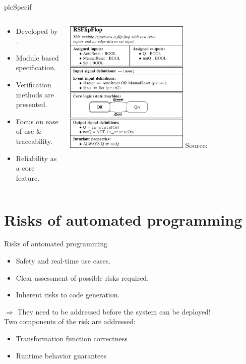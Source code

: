 \documentclass[18pt]{beamer}
\begin{document}
\begin{frame}{plcSpecif}
 	\begin{columns}
 		\begin{column}{0.5\textwidth}
 			\begin{itemize}
 				\item Developed by \cite{7819191}.
 				\item Module based specification.
 				\item Verification methods are presented.
 				\item Focus on ease of use \& traceability.
 				\item Reliability as a core feature.
 			\end{itemize}
 		\end{column}
	 	\begin{column}{0.5\textwidth}
	 		\centering
	 		\includegraphics[width=0.6\textwidth]{./figures/plcspecif.png}
	 		{\footnotesize  Source:~\cite{darvas2015formal}}
	 	\end{column}
 	\end{columns}
\end{frame}

\section{Risks of automated programming}

\begin{frame}{Risks of automated programming}
\begin{itemize}
    \item Safety and real-time use cases.
    \item Clear assessment of possible risks required.
    \item Inherent risks to code generation.
\end{itemize}
$\Rightarrow$ They need to be addressed before the system can be deployed!
\pause
\\
Two components of the risk are addressed:
\begin{itemize}
    \item Transformation function correctness
    \item Runtime behavior guarantees
\end{itemize}
\end{frame}
\end{document}
